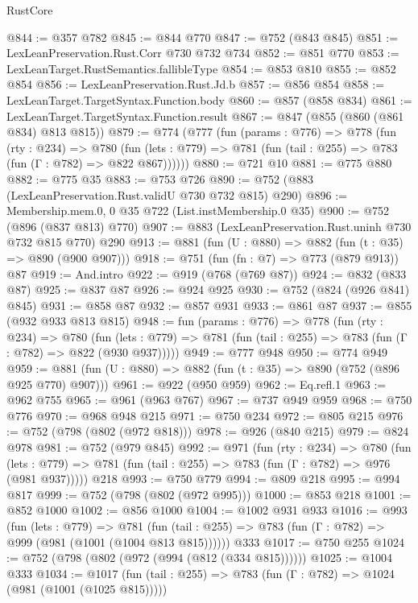 \begin{lexlean}{RustCore}
\begin{coremodule}
@844 := @357 @782
@845 := @844 @770
@847 := @752 (@843 @845)
@851 := LexLeanPreservation.Rust.Corr @730 @732 @734
@852 := @851 @770
@853 := LexLeanTarget.RustSemantics.fallibleType
@854 := @853 @810
@855 := @852 @854
@856 := LexLeanPreservation.Rust.Jd.b
@857 := @856 @854
@858 := LexLeanTarget.TargetSyntax.Function.body
@860 := @857 (@858 @834)
@861 := LexLeanTarget.TargetSyntax.Function.result
@867 := @847 (@855 (@860 (@861 @834) @813 @815))
@879 := @774
    (@777
      (fun (params : @776) =>
      @778
        (fun (rty : @234) =>
        @780
          (fun (lets : @779) => @781 (fun (tail : @255) => @783 (fun (Γ : @782) => @822 @867))))))
@880 := @721 @10
@881 := @775 @880
@882 := @775 @35
@883 := @753 @726
@890 := @752 (@883 (LexLeanPreservation.Rust.validU @730 @732 @815) @290)
@896 := Membership.mem.{0, 0} @35 @722 (List.instMembership.{0} @35)
@900 := @752 (@896 (@837 @813) @770)
@907 := @883 (LexLeanPreservation.Rust.uninh @730 @732 @815 @770) @290
@913 := @881 (fun (U : @880) => @882 (fun (t : @35) => @890 (@900 @907)))
@918 := @751 (fun (fn : @7) => @773 (@879 @913)) @87
@919 := And.intro
@922 := @919 (@768 (@769 @87))
@924 := @832 (@833 @87)
@925 := @837 @87
@926 := @924 @925
@930 := @752 (@824 (@926 @841) @845)
@931 := @858 @87
@932 := @857 @931
@933 := @861 @87
@937 := @855 (@932 @933 @813 @815)
@948 := fun (params : @776) =>
  @778
    (fun (rty : @234) =>
    @780
      (fun (lets : @779) => @781 (fun (tail : @255) => @783 (fun (Γ : @782) => @822 (@930 @937)))))
@949 := @777 @948
@950 := @774 @949
@959 := @881 (fun (U : @880) => @882 (fun (t : @35) => @890 (@752 (@896 @925 @770) @907)))
@961 := @922 (@950 @959)
@962 := Eq.refl.{1}
@963 := @962 @755
@965 := @961 (@963 @767)
@967 := @737 @949 @959
@968 := @750 @776
@970 := @968 @948 @215
@971 := @750 @234
@972 := @805 @215
@976 := @752 (@798 (@802 (@972 @818)))
@978 := @926 (@840 @215)
@979 := @824 @978
@981 := @752 (@979 @845)
@992 := @971
    (fun (rty : @234) =>
    @780
      (fun (lets : @779) => @781 (fun (tail : @255) => @783 (fun (Γ : @782) => @976 (@981 @937)))))
    @218
@993 := @750 @779
@994 := @809 @218
@995 := @994 @817
@999 := @752 (@798 (@802 (@972 @995)))
@1000 := @853 @218
@1001 := @852 @1000
@1002 := @856 @1000
@1004 := @1002 @931 @933
@1016 := @993
    (fun (lets : @779) =>
    @781 (fun (tail : @255) => @783 (fun (Γ : @782) => @999 (@981 (@1001 (@1004 @813 @815))))))
    @333
@1017 := @750 @255
@1024 := @752 (@798 (@802 (@972 (@994 (@812 (@334 @815))))))
@1025 := @1004 @333
@1034 := @1017
    (fun (tail : @255) => @783 (fun (Γ : @782) => @1024 (@981 (@1001 (@1025 @815)))))

\end{coremodule}
\end{lexlean}
